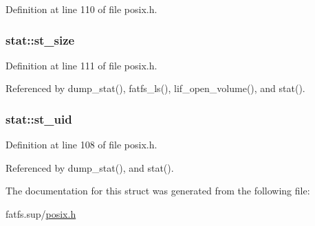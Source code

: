 Definition at line 110 of file posix.\+h.

\subsubsection[{\texorpdfstring{st\+\_\+size}{st_size}}]{ stat\+::st\+\_\+size}\hypertarget{structstat_a040e19c8b9766f841fde8786ce9297bf}{}\label{structstat_a040e19c8b9766f841fde8786ce9297bf}


Definition at line 111 of file posix.\+h.



Referenced by dump\+\_\+stat(), fatfs\+\_\+ls(), lif\+\_\+open\+\_\+volume(), and stat().

\subsubsection[{\texorpdfstring{st\+\_\+uid}{st_uid}}]{ stat\+::st\+\_\+uid}\hypertarget{structstat_a4a8708a3d18be60ee7b2f06c4cab0c70}{}\label{structstat_a4a8708a3d18be60ee7b2f06c4cab0c70}


Definition at line 108 of file posix.\+h.



Referenced by dump\+\_\+stat(), and stat().



The documentation for this struct was generated from the following file\+:\begin{DoxyCompactItemize}
\item 
fatfs.\+sup/\hyperlink{posix_8h}{posix.\+h}\end{DoxyCompactItemize}
